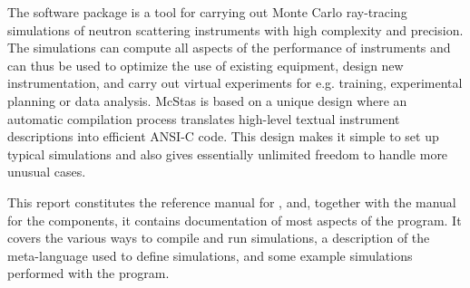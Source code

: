 The software package \MCS is a tool for carrying out Monte Carlo
ray-tracing simulations of neutron scattering instruments with high
complexity and precision. The simulations can compute all aspects of the
performance of instruments and can thus be used to optimize the use of
existing equipment, design new instrumentation, and carry out virtual
experiments for e.g. training, experimental planning or data analysis. McStas
is based on a unique design where an automatic compilation process
translates high-level textual instrument descriptions into efficient
ANSI-C code. This design makes it simple to set up typical simulations
and also gives essentially unlimited freedom to handle more unusual
cases.

This report constitutes the reference manual for \MCS, and,
together with the manual for the \MCS components, it
contains documentation of most aspects of the program. It covers
the various ways to compile and run simulations, a description of the
meta-language used to define simulations, 
and some example simulations performed with
the program.
